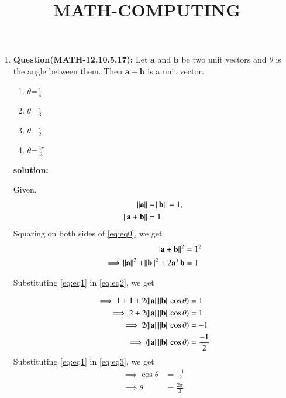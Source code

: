 \documentclass[12pt,-letter paper]{article}
\let\vec\mathbf{}
\let\vec\mathbf{}
\let\vec\mathbf{}
\begin{document}
\title{\textbf{MATH-COMPUTING}}
\maketitle
\begin{enumerate}
 
    \item \textbf{Question(MATH-12.10.5.17):}
       Let $\vec{a}$ and $\vec{b}$ be two unit vectors and $\theta$ is the angle between them. Then $\vec{a}+\vec{b}$ is a unit vector.
    
 \begin{enumerate}[label=(\Alph*)]                     
 \item $\theta$=$\frac{\pi}{4}$
 \item $\theta$=$\frac{\pi}{3}$
  \item $\theta$=$\frac{\pi}{2}$
   \item $\theta$=$\frac{2\pi}{3}$
   \end{enumerate}
		 \textbf{solution:}

Given,
\begin{align}
	\norm{\vec{a}} &= \norm{\vec{b}}=1 
 \label{eq:eq1},\\
	\norm{\vec{a}+\vec{b}}&=1
 \label{eq:eq0}
 \end{align}
Squaring on both sides of \eqref{eq:eq0}, we get
\begin{align}
	\norm{\vec{a}+\vec{b}}^2 &=1^2
\\	
	\implies \norm{\vec{a}}^2 + \norm{\vec{b}}^2 + 2\vec{a}^{\top}\vec{b} &= 1
 \label{eq:eq2}
\end{align}

Substituting \eqref{eq:eq1} in \eqref{eq:eq2}, we get

\begin{align}
	\implies 1+1+2(\norm{\vec{a}}\norm{\vec{b}}\cos{\theta}) &=1\\
	\implies 2+2(\norm{\vec{a}}\norm{\vec{b}}\cos{\theta}) &=1\\
	\implies 2(\norm{\vec{a}}\norm{\vec{b}}\cos{\theta}) &=-1\\
	\implies (\norm{\vec{a}}\norm{\vec{b}}\cos{\theta}) &=\frac{-1}{2}
 \label{eq:eq3}
\end{align}
Substituting \eqref{eq:eq1} in \eqref{eq:eq3}, we get
\begin{align}
	\implies \cos{\theta} &=\frac{-1}{2}
	\\
	\implies \theta &=\frac{2\pi}{3}
\end{align}


\end{enumerate}
\end{document}
